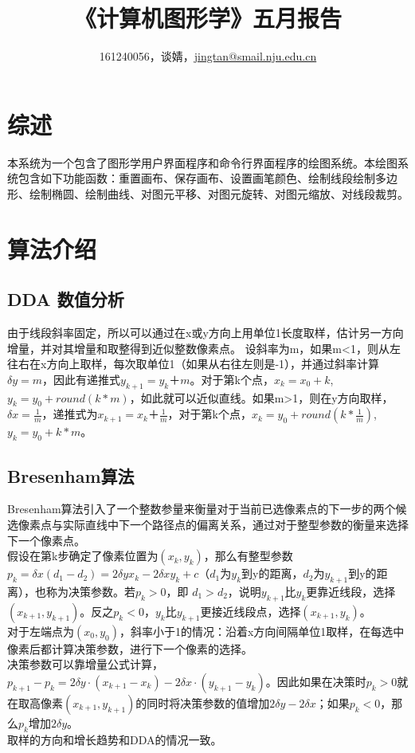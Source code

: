 \documentclass[a4paper,UTF8]{article}
\theoremstyle{definition}
\begin{document}
\title{\textbf{《计算机图形学》五月报告}}
\author{161240056，谈婧，\href{mailto:jingtan@smail.nju.edu.cn}{jingtan@smail.nju.edu.cn}}
\maketitle

\section{综述}
本系统为一个包含了图形学用户界面程序和命令行界面程序的绘图系统。本绘图系统包含如下功能函数：重置画布、保存画布、设置画笔颜色、绘制线段绘制多边形、绘制椭圆、绘制曲线、对图元平移、对图元旋转、对图元缩放、对线段裁剪。

\section{算法介绍}
\subsection{DDA 数值分析}
由于线段斜率固定，所以可以通过在x或y方向上用单位1长度取样，估计另一方向增量，并对其增量和取整得到近似整数像素点。
设斜率为m，如果m<1，则从左往右在x方向上取样，每次取单位1（如果从右往左则是-1），并通过斜率计算$\delta y = m$，因此有递推式$y_{k+1}=y_k＋m$。对于第k个点，$x_k = x_0 + k$, $y_k = y_0+round(k*m)$，如此就可以近似直线。如果m>1，则在y方向取样，$\delta x = \frac{1}{m}$，递推式为$x_{k+1}=x_k＋\frac{1}{m}$，对于第k个点，$x_k = y_0+ round(k*\frac{1}{m})$, $y_k = y_0 + k*m$。
\subsection{Bresenham算法}
Bresenham算法引入了一个整数参量来衡量对于当前已选像素点的下一步的两个候选像素点与实际直线中下一个路径点的偏离关系，通过对于整型参数的衡量来选择下一个像素点。\\
假设在第k步确定了像素位置为$(x_k,y_k)$，那么有整型参数$p_k = \delta x(d_1-d_2) = 2\delta yx_k - 2\delta x y_k + c$（$d_1$为$y_k$到y的距离，$d_2$为$y_{k+1}$到y的距离），也称为决策参数。若$p_k > 0$，即 $d_1 > d_2$，说明$y_{k+1}$比$y_k$更靠近线段，选择$(x_{k+1}, y_{k+1})$。反之$p_k < 0$，$y_k$比$y_{k+1}$更接近线段点，选择$(x_{k+1}, y_{k})$。\\
对于左端点为$(x_0,y_0)$，斜率小于1的情况：沿着x方向间隔单位1取样，在每选中像素后都计算决策参数，进行下一个像素的选择。\\
决策参数可以靠增量公式计算，$p_{k+1}-p_k = 2\delta y \cdot (x_{k+1}-x_k) - 2\delta x \cdot (y_{k+1}-y_k)$。因此如果在决策时$p_k>0$就在取高像素$(x_{k+1},y_{k+1})$的同时将决策参数的值增加$2\delta y - 2 \delta x$；如果$p_k < 0$，那么$p_k$增加$2\delta y$。\\
取样的方向和增长趋势和DDA的情况一致。
\end{document}
